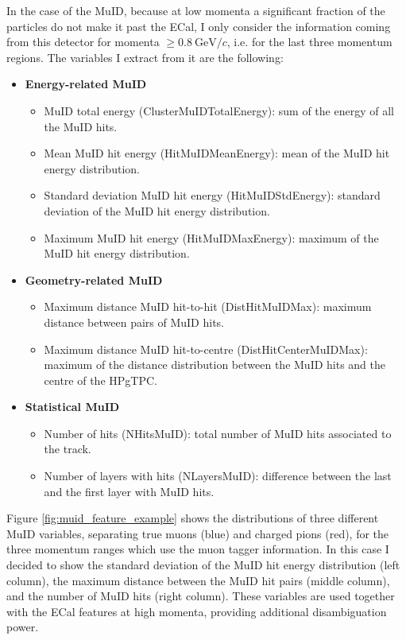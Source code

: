 In the case of the MuID, because at low momenta a significant fraction of the particles do not make it past the ECal, I only consider the information coming from this detector for momenta $\geq 0.8~\mathrm{GeV}/c$, i.e. for the last three momentum regions. The variables I extract from it are the following:
\begin{itemize}
	\item \textbf{Energy-related MuID}
	\begin{itemize}
		\item MuID total energy (ClusterMuIDTotalEnergy): sum of the energy of all the MuID hits.
		\item Mean MuID hit energy (HitMuIDMeanEnergy): mean of the MuID hit energy distribution.
		\item Standard deviation MuID hit energy (HitMuIDStdEnergy): standard deviation of the MuID hit energy distribution.
		\item Maximum MuID hit energy (HitMuIDMaxEnergy): maximum of the MuID hit energy distribution.
	\end{itemize}
	\item \textbf{Geometry-related MuID}
	\begin{itemize}
		\item Maximum distance MuID hit-to-hit (DistHitMuIDMax): maximum distance between pairs of MuID hits.
		\item Maximum distance MuID hit-to-centre (DistHitCenterMuIDMax): maximum of the distance distribution between the MuID hits and the centre of the HPgTPC.
	\end{itemize}
	\item \textbf{Statistical MuID}
	\begin{itemize}
		\item Number of hits (NHitsMuID): total number of MuID hits associated to the track.
		\item Number of layers with hits (NLayersMuID): difference between the last and the first layer with MuID hits.
	\end{itemize}
\end{itemize}

Figure \ref{fig:muid_feature_example} shows the distributions of three different MuID variables, separating true muons (blue) and charged pions (red), for the three momentum ranges which use the muon tagger information. In this case I decided to show the standard deviation of the MuID hit energy distribution (left column), the maximum distance between the MuID hit pairs (middle column), and the number of MuID hits (right column). These variables are used together with the ECal features at high momenta, providing additional disambiguation power.

